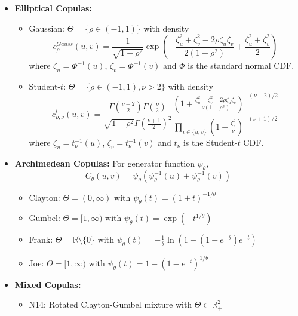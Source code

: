 \begin{itemize}
\item \textbf{Elliptical Copulas:}
   \begin{itemize}
   \item Gaussian: $\Theta = \{\rho \in (-1,1)\}$ with density
   \[
   c_\rho^{Gauss}(u,v) = \frac{1}{\sqrt{1-\rho^2}} \exp\left(-\frac{\zeta_u^2 + \zeta_v^2 - 2\rho\zeta_u\zeta_v}{2(1-\rho^2)} + \frac{\zeta_u^2 + \zeta_v^2}{2}\right)
   \]
   where $\zeta_u = \Phi^{-1}(u)$, $\zeta_v = \Phi^{-1}(v)$ and $\Phi$ is the standard normal CDF.
   
   \item Student-$t$: $\Theta = \{\rho \in (-1,1), \nu > 2\}$ with density
   \[
   c_{\rho,\nu}^{t}(u,v) = \frac{\Gamma\left(\frac{\nu+2}{2}\right)\Gamma\left(\frac{\nu}{2}\right)}{\sqrt{1-\rho^2}\Gamma\left(\frac{\nu+1}{2}\right)^2} 
   \frac{\left(1 + \frac{\zeta_u^2 + \zeta_v^2 - 2\rho\zeta_u\zeta_v}{\nu(1-\rho^2)}\right)^{-(\nu+2)/2}}{\prod_{i\in\{u,v\}} \left(1 + \frac{\zeta_i^2}{\nu}\right)^{-(\nu+1)/2}}
   \]
   where $\zeta_u = t_\nu^{-1}(u)$, $\zeta_v = t_\nu^{-1}(v)$ and $t_\nu$ is the Student-$t$ CDF.
   \end{itemize}	

\item \textbf{Archimedean Copulas:} For generator function $\psi_\theta$, 
\[
C_\theta(u,v) = \psi_\theta(\psi_\theta^{-1}(u) + \psi_\theta^{-1}(v))
\]
    \begin{itemize}
    \item Clayton: $\Theta = (0, \infty)$ with $\psi_\theta(t) = (1 + t)^{-1/\theta}$
    \item Gumbel: $\Theta = [1, \infty)$ with $\psi_\theta(t) = \exp(-t^{1/\theta})$
    \item Frank: $\Theta = \mathbb{R}\setminus\{0\}$ with $\psi_\theta(t) = -\frac{1}{\theta}\ln\left(1 - (1 - e^{-\theta})e^{-t}\right)$
    \item Joe: $\Theta = [1, \infty)$ with $\psi_\theta(t) = 1 - (1 - e^{-t})^{1/\theta}$
    \end{itemize}

\item \textbf{Mixed Copulas:}
    \begin{itemize}
    \item N14: Rotated Clayton-Gumbel mixture with $\Theta \subset \mathbb{R}^2_+$
    \end{itemize}
\end{itemize}



